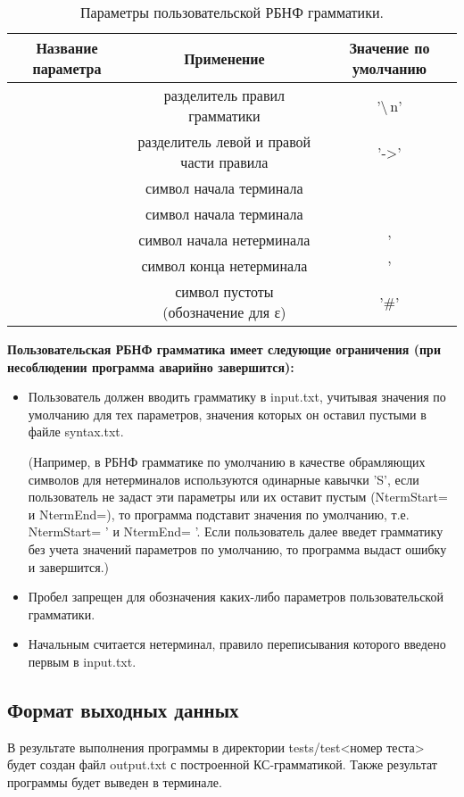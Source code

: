 \documentclass{article}
\begin{document}
\begin{table}[h!]
\centering
\begin{tabular}{ |c | c | c| }
\hline 
Название параметра & Применение	& Значение по умолчанию \\ [0.5ex]
\hline
[Delim]	& разделитель правил грамматики	& '\backslash\,n' \\ [0.5ex]
\hline
[Arrow]	& разделитель левой и правой части правила	& '->' \\ [0.5ex]
\hline
[TermStart]	& символ начала терминала &  \\ [0.5ex]
\hline
[TermEnd] & символ начала терминала &  \\ [0.5ex]
\hline
[NtermStart] & символ начала нетерминала & ' \\ [0.5ex]
\hline
[NtermEnd] & символ конца нетерминала & ' \\ [0.5ex]
\hline
[Empty] & символ пустоты (обозначение для ε) & '\#' \\ [0.5ex]
\hline
\end{tabular}
\caption{Параметры пользовательской РБНФ грамматики.}
\end{table}

\newline
\textbf{Пользовательская РБНФ грамматика имеет следующие ограничения (при несоблюдении программа аварийно завершится):}

\begin{itemize}
\item Пользователь должен вводить грамматику в input.txt, учитывая значения по умолчанию для тех параметров, значения которых он оставил пустыми в файле syntax.txt.

(Например, в РБНФ грамматике по умолчанию в качестве обрамляющих символов для нетерминалов используются одинарные кавычки 'S', если пользователь не задаст эти параметры или их оставит пустым (NtermStart= и NtermEnd=), то программа подставит значения по умолчанию, т.е.
NtermStart= ' и NtermEnd= '. Если пользователь далее введет грамматику без учета значений параметров по умолчанию, то программа выдаст ошибку и завершится.)
\item Пробел запрещен для обозначения каких-либо параметров пользовательской грамматики.
\item Начальным считается нетерминал, правило переписывания которого введено первым в input.txt.
\end{itemize}

\subsection{Формат выходных данных}
В результате выполнения программы в директории tests/test<номер теста> будет создан файл output.txt с построенной КС-грамматикой. Также результат программы будет выведен в терминале.
\end{document}
